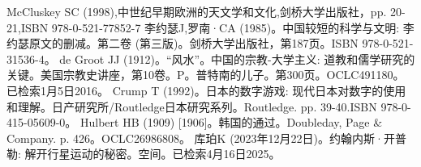 \begin{enumerate}
 McCluskey SC (1998),中世纪早期欧洲的天文学和文化,剑桥大学出版社，pp. 20-21,ISBN 978-0-521-77852-7
 李约瑟J,罗南·CA (1985)。中国较短的科学与文明: 李约瑟原文的删减。第二卷 (第三版)。剑桥大学出版社，第187页。ISBN 978-0-521-31536-4。
 de Groot JJ (1912)。“风水”。中国的宗教-大学主义: 道教和儒学研究的关键。美国宗教史讲座，第10卷。P。普特南的儿子。第300页。OCLC491180。已检索1月5日2016。 
 Crump T (1992)。日本的数字游戏: 现代日本对数字的使用和理解。日产研究所/Routledge日本研究系列。Routledge. pp. 39-40.ISBN 978-0-415-05609-0。
 Hulbert HB (1909) [1906]。韩国的通过。Doubleday, Page & Company. p. 426。OCLC26986808。 
 库珀K (2023年12月22日)。约翰内斯·开普勒: 解开行星运动的秘密。空间。已检索4月16日2025。




\end{enumerate}